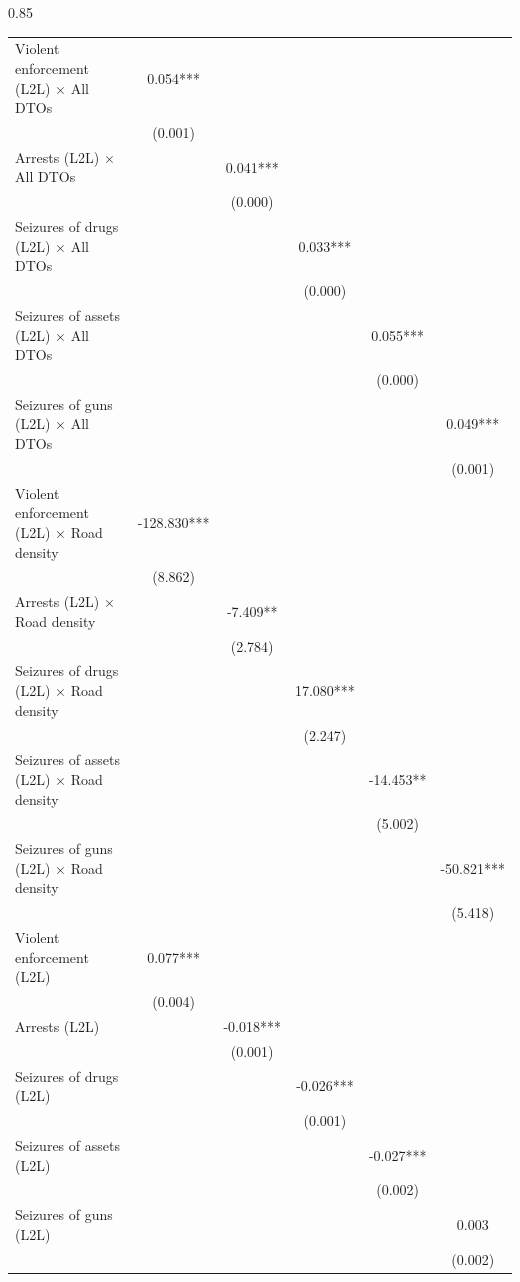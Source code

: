 \documentclass[12pt,letterpaper]{article}
\begin{document}
\begin{landscape}
\begin{center}
\begin{spacing}{0.85}
\begin{longtable}{lccccc}
Violent enforcement (L2L) $\times$ All DTOs & 0.054*** &   &   &   &   \\
 & (0.001)  &   &   &   &   \\
Arrests (L2L) $\times$ All DTOs &   & 0.041*** &   &   &   \\
 &   & (0.000)  &   &   &   \\
Seizures of drugs (L2L) $\times$ All DTOs &   &   & 0.033*** &   &   \\
 &   &   & (0.000)  &   &   \\
Seizures of assets (L2L) $\times$ All DTOs &   &   &   & 0.055*** &   \\
 &   &   &   & (0.000)  &   \\
Seizures of guns (L2L) $\times$ All DTOs &   &   &   &   & 0.049*** \\
 &   &   &   &   & (0.001)  \\
                
Violent enforcement (L2L) $\times$ Road density & -128.830*** &   &   &   &   \\
 & (8.862)  &   &   &   &   \\
Arrests (L2L) $\times$ Road density &   & -7.409** &   &   &   \\
 &   & (2.784)  &   &   &   \\
Seizures of drugs (L2L) $\times$ Road density &   &   & 17.080*** &   &   \\
 &   &   & (2.247)  &   &   \\
Seizures of assets (L2L) $\times$ Road density &   &   &   & -14.453** &   \\
 &   &   &   & (5.002)  &   \\
Seizures of guns (L2L) $\times$ Road density &   &   &   &   & -50.821*** \\
 &   &   &   &   & (5.418)  \\
                
Violent enforcement (L2L)  & 0.077*** &   &   &   &   \\
 & (0.004)  &   &   &   &   \\
Arrests (L2L)  &   & -0.018*** &   &   &   \\
 &   & (0.001)  &   &   &   \\
Seizures of drugs (L2L)  &   &   & -0.026*** &   &   \\
 &   &   & (0.001)  &   &   \\
Seizures of assets (L2L) &   &   &   & -0.027*** &   \\
 &   &   &   & (0.002)  &   \\
Seizures of guns (L2L)  &   &   &   &   & 0.003  \\
 &   &   &   &   & (0.002)  \\
                

\end{longtable}
\end{spacing}
\end{center}
\end{landscape}
\end{document}
